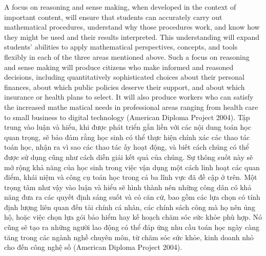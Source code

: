 \documentclass[
  10pt,
  a4paper,
  landscape,
  twoside,
  openany
]{scrbook}
\newcommand{\EN}[1]{#1}
\newcommand{\VI}[1]{#1}
\newcommand{\NOTE}[1]{#1}
\begin{document}
\TriPara
{
\EN{A focus on reasoning and sense making, when developed in the context of important content, will ensure that students can accurately carry out mathematical procedures, understand why those procedures work, and know how they might be used and their results interpreted. This understanding will expand students' abilities to apply mathematical perspectives, concepts, and tools flexibly in each of the three areas mentioned above. Such a focus on reasoning and sense making will produce citizens who make informed and reasoned decisions, including quantitatively sophisticated choices about their personal finances, about which public policies deserve their support, and about which insurance or health plans to select. It will also produce workers who can satisfy the increased mathe matical needs in professional areas ranging from health care to small business to digital technology (American Diploma Project 2004).}
}
{
\VI{Tập trung vào luận và hiểu, khi được phát triển gắn liền với các nội dung toán học quan trọng, sẽ bảo đảm rằng học sinh có thể thực hiện chính xác các thao tác toán học, nhận ra vì sao các thao tác ấy hoạt động, và biết cách chúng có thể được sử dụng cũng như cách diễn giải kết quả của chúng. Sự thông suốt này sẽ mở rộng khả năng của học sinh trong việc vận dụng một cách linh hoạt các quan điểm, khái niệm và công cụ toán học trong cả ba lĩnh vực đã đề cập ở trên. Một trọng tâm như vậy vào luận và hiểu sẽ hình thành nên những công dân có khả năng đưa ra các quyết định sáng suốt và có căn cứ, bao gồm các lựa chọn có tính định lượng liên quan đến tài chính cá nhân, các chính sách công mà họ nên ủng hộ, hoặc việc chọn lựa gói bảo hiểm hay kế hoạch chăm sóc sức khỏe phù hợp. Nó cũng sẽ tạo ra những người lao động có thể đáp ứng nhu cầu toán học ngày càng tăng trong các ngành nghề chuyên môn, từ chăm sóc sức khỏe, kinh doanh nhỏ cho đến công nghệ số (American Diploma Project 2004).}
}
{
\NOTE{}
}
\end{document}

